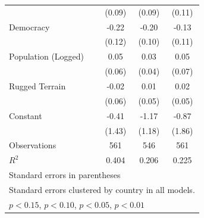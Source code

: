\documentclass[12pt, letterpaper]{article}
\begin{document}
\begin{table}[htbp]
\begin{small}
\begin{tabular}{l*{3}{c}}
                    &      (0.09)         &      (0.09)         &      (0.11)         \\
Democracy           &       -0.22\sym{*}  &       -0.20\sym{*}  &       -0.13         \\
                    &      (0.12)         &      (0.10)         &      (0.11)         \\
Population (Logged) &        0.05         &        0.03         &        0.05         \\
                    &      (0.06)         &      (0.04)         &      (0.07)         \\
Rugged Terrain      &       -0.02         &        0.01         &        0.02         \\
                    &      (0.06)         &      (0.05)         &      (0.05)         \\
Constant            &       -0.41         &       -1.17         &       -0.87         \\
                    &      (1.43)         &      (1.18)         &      (1.86)         \\
\hline
Observations        &         561         &         546         &         561         \\
\(R^{2}\)           &       0.404         &       0.206         &       0.225         \\
\hline\hline
\multicolumn{4}{l}{\footnotesize Standard errors in parentheses}\\
\multicolumn{4}{l}{\footnotesize Standard errors clustered by country in all models.}\\
\multicolumn{4}{l}{\footnotesize \sym{+} \(p<0.15\), \sym{*} \(p<0.10\), \sym{**} \(p<0.05\), \sym{***} \(p<0.01\)}\\
\end{tabular}
\end{small}
\end{table}
\end{document}
